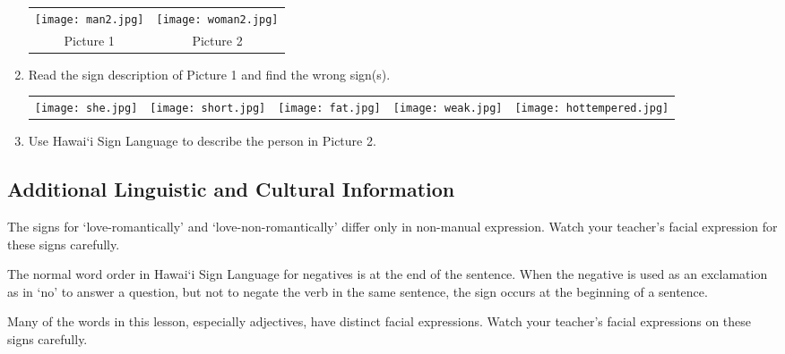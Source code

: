 \documentclass{tufte-book}
\begin{document}
\begin{enumerate}
\begin{table*}[h!]
\begin{tabular}{c c c c c}
\end{tabular}
\end{table*}

\begin{table*}[h!]
\begin{tabular}{c c}
\texttt{[image: man2.jpg]}&\texttt{[image: woman2.jpg]}\\
\footnotesize Picture 1 & \footnotesize Picture 2\\
\end{tabular}
\end{table*}
\newpage
\item Read the sign description of Picture 1 and find the wrong sign(s).
\begin{table*}[h!]
\begin{tabular}{c c c c c}
\texttt{[image: she.jpg]}&\texttt{[image: short.jpg]}&\texttt{[image: fat.jpg]} &\texttt{[image: weak.jpg]}&\texttt{[image: hottempered.jpg]}\\

\end{tabular}
\end{table*}
\item Use Hawai`i Sign Language to describe the person in Picture 2.

\end{enumerate}
\newpage

\subsection{Additional Linguistic and Cultural Information}

The signs for `love-romantically' and `love-non-romantically' differ only in non-manual expression. Watch your teacher’s facial expression for these signs carefully.

The normal word order in Hawai`i Sign Language for negatives is at the end of the sentence. When the negative is used as an exclamation as in `no' to answer a question, but not to negate the verb in the same sentence, the sign occurs at the beginning of a sentence.

Many of the words in this lesson, especially adjectives, have distinct facial expressions. Watch your teacher’s facial expressions on these signs carefully.
\end{document}
